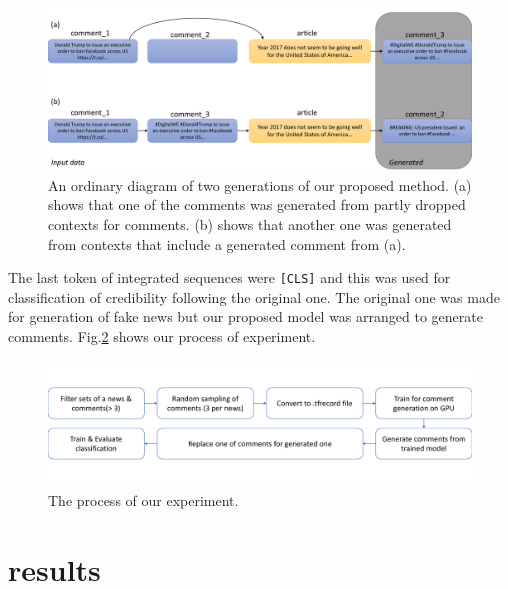 \documentclass[conference]{IEEEtran}
\begin{document}
\begin{figure}[!t]
    \centering
    \includegraphics[width=\linewidth,pagebox=cropbox,clip]{fig_method.pdf}
    \caption{
        An ordinary diagram of two generations of our proposed method.
        (a) shows that one of the comments was generated from partly dropped contexts for comments.
        (b) shows that another one was generated from contexts that include a generated comment from (a).
    }
    \label{fig:method}
\end{figure}

The last token of integrated sequences were \texttt{[CLS]} and this was used for classification of credibility following the original one.
The original one was made for generation of fake news but our proposed model was arranged to generate comments.
Fig.\ref{fig:process} shows our process of experiment.

\begin{figure}[!t]
    \centering
    \includegraphics[width=0.8\linewidth,pagebox=cropbox,clip]{fig_process.pdf}
    \caption{The process of our experiment.}
    \label{fig:process}
\end{figure}

\section{results}
\end{document}

